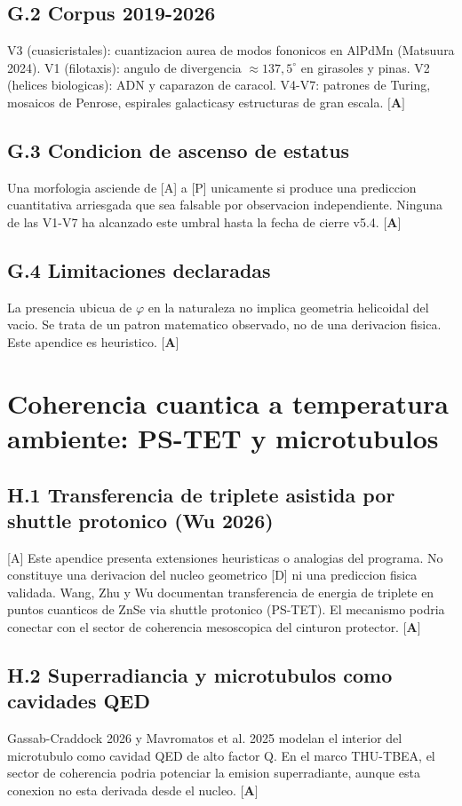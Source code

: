 ﻿\documentclass[11pt,letterpaper]{article}
\begin{document}
\subsection{G.2 Corpus 2019-2026}
V3 (cuasicristales): cuantizacion aurea de modos fononicos en AlPdMn (Matsuura 2024). V1 (filotaxis): angulo de divergencia $\approx 137{,}5^\circ$ en girasoles y pinas. V2 (helices biologicas): ADN y caparazon de caracol. V4-V7: patrones de Turing, mosaicos de Penrose, espirales galacticasy estructuras de gran escala. $\textbf{[A]}$
\subsection{G.3 Condicion de ascenso de estatus}
Una morfologia asciende de [A] a [P] unicamente si produce una prediccion cuantitativa arriesgada que sea falsable por observacion independiente. Ninguna de las V1-V7 ha alcanzado este umbral hasta la fecha de cierre v5.4. $\textbf{[A]}$
\subsection{G.4 Limitaciones declaradas}
La presencia ubicua de $\varphi$ en la naturaleza no implica geometria helicoidal del vacio. Se trata de un patron matematico observado, no de una derivacion fisica. Este apendice es heuristico. $\textbf{[A]}$
\section{Coherencia cuantica a temperatura ambiente: PS-TET y microtubulos}
\subsection{H.1 Transferencia de triplete asistida por shuttle protonico (Wu 2026)}
[A] Este apendice presenta extensiones heuristicas o analogias del programa. No constituye una derivacion del nucleo geometrico [D] ni una prediccion fisica validada. Wang, Zhu y Wu documentan transferencia de energia de triplete en puntos cuanticos de ZnSe via shuttle protonico (PS-TET). El mecanismo podria conectar con el sector de coherencia mesoscopica del cinturon protector. $\textbf{[A]}$
\subsection{H.2 Superradiancia y microtubulos como cavidades QED}
Gassab-Craddock 2026 y Mavromatos et al. 2025 modelan el interior del microtubulo como cavidad QED de alto factor Q. En el marco THU-TBEA, el sector de coherencia podria potenciar la emision superradiante, aunque esta conexion no esta derivada desde el nucleo. $\textbf{[A]}$
\end{document}
